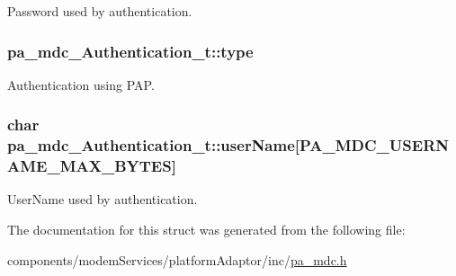 Password used by authentication. 

\subsubsection[{\texorpdfstring{type}{type}}]{ pa\+\_\+mdc\+\_\+\+Authentication\+\_\+t\+::type}\hypertarget{structpa__mdc___authentication__t_a3825fb8da976396a3e278b11ccf40c20}{}\label{structpa__mdc___authentication__t_a3825fb8da976396a3e278b11ccf40c20}


Authentication using P\+AP. 

\subsubsection[{\texorpdfstring{user\+Name}{userName}}]{\setlength{\rightskip}{0pt plus 5cm}char pa\+\_\+mdc\+\_\+\+Authentication\+\_\+t\+::user\+Name\mbox{[}{\bf P\+A\+\_\+\+M\+D\+C\+\_\+\+U\+S\+E\+R\+N\+A\+M\+E\+\_\+\+M\+A\+X\+\_\+\+B\+Y\+T\+ES}\mbox{]}}\hypertarget{structpa__mdc___authentication__t_a5c1bf69d2864d11f5dc20a1033bf0508}{}\label{structpa__mdc___authentication__t_a5c1bf69d2864d11f5dc20a1033bf0508}


User\+Name used by authentication. 



The documentation for this struct was generated from the following file\+:\begin{DoxyCompactItemize}
\item 
components/modem\+Services/platform\+Adaptor/inc/\hyperlink{pa__mdc_8h}{pa\+\_\+mdc.\+h}\end{DoxyCompactItemize}
